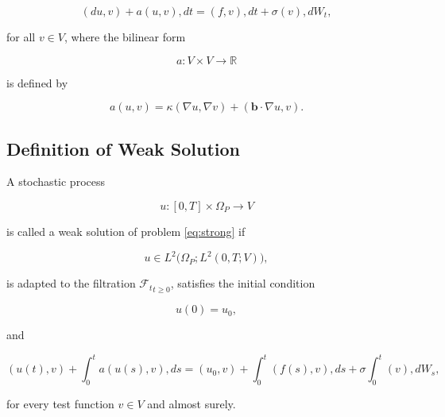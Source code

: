 \[
(du,v)
+
a(u,v),dt
=
(f,v),dt
+
\sigma(v),dW_t,
\]

for all $v\in V$, where the bilinear form

\[
a:V\times V\rightarrow\mathbb R
\]

is defined by

\[
a(u,v)
=
\kappa(\nabla u,\nabla v)
+
(\mathbf b\cdot\nabla u,v).
\]

\subsection{Definition of Weak Solution}

A stochastic process

\[
u:[0,T]\times\Omega_P\rightarrow V
\]

is called a weak solution of problem \eqref{eq:strong} if

\[
u
\in
L^2\bigl(
\Omega_P;
L^2(0,T;V)
\bigr),
\]

is adapted to the filtration
${\mathcal F_t}_{t\ge0}$,
satisfies the initial condition

\[
u(0)=u_0,
\]

and

\[
(u(t),v)
+
\int_0^t a(u(s),v),ds
=
(u_0,v)
+
\int_0^t (f(s),v),ds
+
\sigma\int_0^t (v),dW_s,
\]

for every test function $v\in V$ and almost surely.
